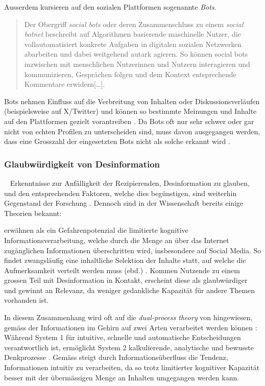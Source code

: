 \documentclass[12pt,a4paper]{article}        %
\begin{document}
Ausserdem kursieren auf den sozialen Plattformen sogenannte \textit{Bots}.
\begin{quote}
  Der Obergriff  \textit{social bots} oder deren Zusammenschluss zu einem \textit{social botnet} beschreibt auf Algorithmen basierende maschinelle Nutzer, die vollautomatisiert konkrete Aufgaben in digitalen sozialen Netzwerken abarbeiten und dabei weitgehend autark agieren. So können social bots inzwischen mit menschlichen Nutzerinnen und Nutzern interagieren und kommunizieren, Gesprächen folgen und dem Kontext entsprechende Kommentare erwidern[\ldots]. \parencite[493f]{behnke_manipulation_2018}
\end{quote}

\pagebreak
Bots nehmen Einfluss auf die Verbreitung von Inhalten oder Diskussionsverläufen (beispielsweise auf X/Twitter) und können so bestimmte Meinungen und Inhalte auf den Plattformen gezielt vorantreiben \parencite[495f]{behnke_manipulation_2018}. Da Bots oft nur sehr schwer oder gar nicht von echten Profilen zu unterscheiden sind, muss davon ausgegangen werden, dass eine Grosszahl der eingesetzten Bots nicht als solche erkannt wird \parencite[1095]{lazer_science_2018}.

\subsubsection{Glaubwürdigkeit von Desinformation}
~\label{theory_credibility}
Erkenntnisse zur Anfälligkeit der Rezipierenden, Desinformation zu glauben, und den entsprechenden Faktoren, welche dies begünstigen, sind weiterhin Gegenstand der Forschung \parencites[1094]{lazer_science_2018}[486]{schaewitz_when_2020}. Dennoch sind in der Wissenschaft bereits einige Theorien bekannt:

\textcite[248]{hohlfeld_schlechte_2020} erwähnen als ein Gefahrenpotenzial die limitierte kognitive Informationsverarbeitung, welche durch die Menge an über das Internet zugänglichen Informationen überschritten wird, insbesondere auf Social Media. So findet zwangsläufig eine inhaltliche Selektion der Inhalte statt, auf welche die Aufmerksamkeit verteilt werden muss (ebd.) \parencite[vgl.\ auch][5]{tandoc_jr_facts_2019}. Kommen Nutzende zu einem grossen Teil mit Desinformation in Kontakt, erscheint diese als glaubwürdiger und gewinnt an Relevanz, da weniger gedankliche Kapazität für andere Themen vorhanden ist.

In diesem Zusammenhang wird oft auf die \textit{dual-process theory} von \textcite{kahneman_thinking_2024} hingewiesen, gemäss der Informationen im Gehirn auf zwei Arten verarbeitet werden können \parencite[40]{pennycook_lazy_2019}: Während System 1 für intuitive, schnelle und automatische Entscheidungen verantwortlich ist, ermöglicht System 2 kalkulierende, analytische und bewusste Denkprozesse \parencite[249]{hohlfeld_schlechte_2020}. Gemäss \textcite[487]{schaewitz_when_2020} steigt durch Informationsüberfluss die Tendenz, Informationen intuitiv zu verarbeiten, da so trotz limitierter kognitiver Kapazität besser mit der übermässigen Menge an Inhalten umgegangen werden kann.
\end{document}
